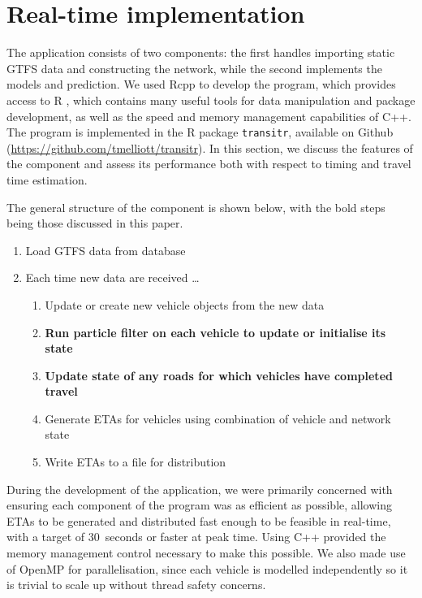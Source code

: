\section{Real-time implementation}
\label{sec:rt}

The application consists of two components:
the first handles importing static GTFS data and constructing the network,
while the second implements the \rt models and prediction.
We used Rcpp \citep{Rcpp}
to develop the program,
which provides access to R \citep{rcore},
which contains many useful tools for data manipulation and package development,
as well as the speed and memory management capabilities of C++.
The program is implemented in the R package
\verb+transitr+, available on Github (\url{https://github.com/tmelliott/transitr}).
In this section, we discuss the features of the \rt component
and assess its performance 
both with respect to timing and travel time estimation.

The general structure of the \rt component is shown below,
with the bold steps being those discussed in this paper.
\begin{enumerate}
\item Load GTFS data from database
\item Each time new data are received \ldots
\begin{enumerate}
    \item Update or create new vehicle objects from the new data
    \item \textbf{Run particle filter on each vehicle to update or initialise its state}
    \item \textbf{Update state of any roads for which vehicles 
        have completed travel}
    \item Generate ETAs for vehicles using combination of vehicle and network state
    \item Write ETAs to a file for distribution
\end{enumerate}
\end{enumerate}


During the development of the application,
we were primarily concerned with ensuring each component of the program
was as efficient as possible,
allowing ETAs to be generated and distributed fast enough to be feasible in real-time,
with a target of 30~seconds or faster at peak time.
Using C++ provided the memory management control necessary to make this possible.
We also made use of OpenMP for parallelisation,
since each vehicle is modelled independently so it is trivial to scale up without
thread safety concerns.


